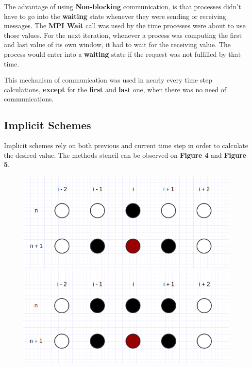 \documentclass[12pt]{article}
\begin{document}
\par The advantage of using \textbf{Non-blocking} communication, is that processes didn't have to go into the \textbf{waiting} state whenever they were sending or receiving messages. The \textbf{MPI Wait} call was used by the time processes were about to use those values. For the next iteration, whenever a process was computing the first and last value of its own window, it had to wait for the receiving value. The process would enter into a \textbf{waiting} state if the request was not fulfilled by that time. 

\par This mechanism of communication was used in nearly every time step calculations, \textbf{except} for the \textbf{first} and \textbf{last} one, when there was no need of communications.

\subsection*{Implicit Schemes}

\par Implicit schemes rely on both previous and current time step in order to calculate the desired value\cite{fraga}. The methods stencil can be observed on \textbf{Figure 4} and \textbf{Figure 5}. 

\begin{figure}[!htb]
\centering
\begin{minipage}{.5\textwidth}
  \centering
  \includegraphics[width=.8\linewidth]{laasonen.png}
\end{minipage}%
\begin{minipage}{.5\textwidth}
  \centering
  \includegraphics[width=.8\linewidth]{crank-nicholson.png}
\end{minipage}
\end{figure}
\end{document}
